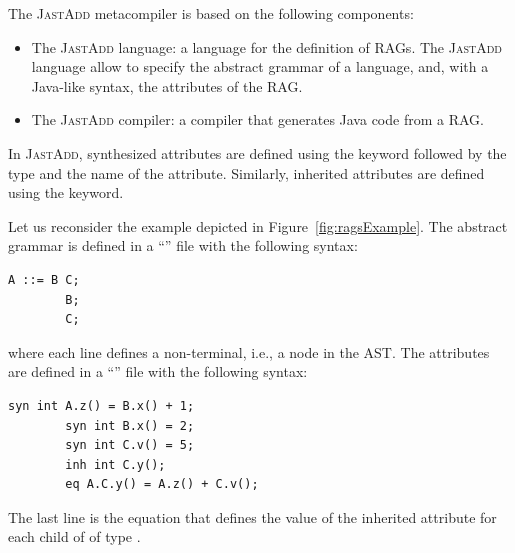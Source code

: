 The \textsc{JastAdd} metacompiler is based on the following components:
\begin{itemize}
    \item The \textsc{JastAdd} language: a language for the definition of RAGs.
    The \textsc{JastAdd} language allow to specify the abstract grammar of a language, and,
    with a Java-like syntax, the attributes of the RAG.
    \item The \textsc{JastAdd} compiler: a compiler that generates Java code from a RAG.
\end{itemize}
In \textsc{JastAdd}, synthesized attributes are defined using the  keyword followed
by the type and the name of the attribute. Similarly, inherited attributes are defined
using the  keyword.

Let us reconsider the example depicted in Figure~\ref{fig:ragsExample}.
The abstract grammar is defined in a ``'' file with the following syntax:
    \begin{lstlisting}[language=JastAdd]
        A ::= B C;
        B;
        C;
    \end{lstlisting}
where each line defines a non-terminal, i.e., a node in the AST.
The attributes are defined in a ``'' file with the following syntax:
    \begin{lstlisting}[language=JastAdd]
        syn int A.z() = B.x() + 1;
        syn int B.x() = 2;
        syn int C.v() = 5;
        inh int C.y();
        eq A.C.y() = A.z() + C.v();
    \end{lstlisting}
The last line is the equation that defines the value of the inherited attribute  for each child of  of type .
